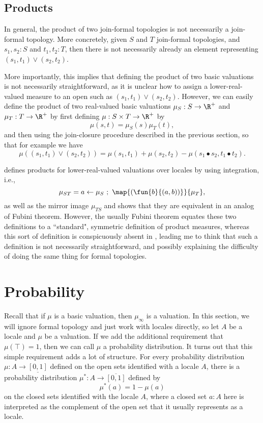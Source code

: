 \subsection{Products}

In general, the product of two join-formal topologies is not necessarily a join-formal topology. More concretely, given $S$ and $T$ join-formal topologies, and $s_1, s_2 : S$ and $t_1, t_2 : T$, then there is not necessarily already an element representing $(s_1, t_1) \vee (s_2, t_2)$.

More importantly, this implies that defining the product of two basic valuations is not necessarily straightforward, as it is unclear how to assign a lower-real-valued measure to an open such as $(s_1, t_1) \vee (s_2, t_2)$. However, we can easily define the product of two real-valued basic valuations $\mu_S : S \to \R^+$ and $\mu_T : T \to \R^+$ by first defining $\mu : S \times T \to \R^+$ by
\[
\mu(s, t) = \mu_S(s) \mu_T(t),
\]
and then using the join-closure procedure described in the previous section, so that for example we have
\[
\mu((s_1, t_1) \vee (s_2, t_2)) = \mu(s_1, t_1) + \mu(s_2, t_2) - \mu(s_1 \bullet s_2, t_1 \bullet t_2).
\]

\cite{vickers2011} defines products for lower-real-valued valuations over locales by using integration, i.e.,
\[
\mu_{ST} = a \leftarrow \mu_S \ ; \ \map{(\fun{b}{(a, b))}}{\mu_T},
\]
as well as the mirror image $\mu_{TS}$ and shows that they are equivalent in an analog of Fubini theorem. However, the usually Fubini theorem equates these two definitions to a ``standard", symmetric definition of product measures, whereas this sort of definition is conspicuously absent in \cite{vickers2011}, leading me to think that such a definition is not necessarily straightforward, and possibly explaining the difficulty of doing the same thing for formal topologies.

\section{Probability}

Recall that if $\mu$ is a basic valuation, then $\mu_\infty$ is a valuation. In this section, we will ignore formal topology and just work with locales directly, so let $A$ be a locale and $\mu$ be a valuation. If we add the additional requirement that $\mu(\top) = 1$, then we can call $\mu$ a probability distribution. It turns out that this simple requirement adds a lot of structure. For every probability distribution $\mu : A \to \underline{[0,1]}$ defined on the open sets identified with a locale $A$, there is a probability distribution $\mu^* : A \to \overline{[0,1]}$ defined by
\[
\mu^*(a) = 1 - \mu(a)
\]
on the closed sets identified with the locale $A$, where a closed set $a : A$ here is interpreted as the complement of the open set that it usually represents as a locale.

